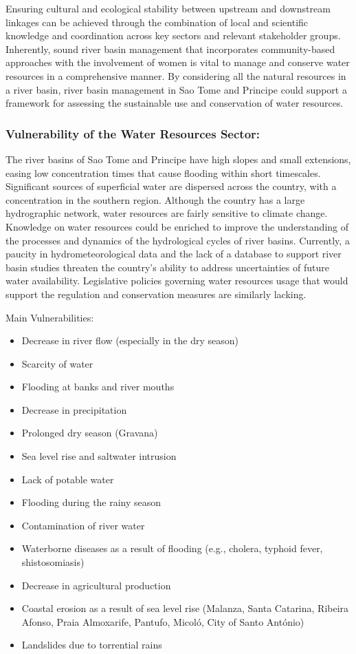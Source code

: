 \documentclass[
]{book}
\providecommand{\tightlist}{%
  \setlength{\itemsep}{0pt}\setlength{\parskip}{0pt}}
\begin{document}
Ensuring cultural and ecological stability between upstream and downstream linkages can be achieved through the combination of local and scientific knowledge and coordination across key sectors and relevant stakeholder groups. Inherently, sound river basin management that incorporates community-based approaches with the involvement of women is vital to manage and conserve water resources in a comprehensive manner. By considering all the natural resources in a river basin, river basin management in Sao Tome and Principe could support a framework for assessing the sustainable use and conservation of water resources.

\hypertarget{vulnerability-of-the-water-resources-sector-1}{%
\subsubsection{Vulnerability of the Water Resources Sector:}\label{vulnerability-of-the-water-resources-sector-1}}

The river basins of Sao Tome and Principe have high slopes and small extensions, easing low concentration times that cause flooding within short timescales. Significant sources of superficial water are dispersed across the country, with a concentration in the southern region. Although the country has a large hydrographic network, water resources are fairly sensitive to climate change. Knowledge on water resources could be enriched to improve the understanding of the processes and dynamics of the hydrological cycles of river basins. Currently, a paucity in hydrometeorological data and the lack of a database to support river basin studies threaten the country's ability to address uncertainties of future water availability. Legislative policies governing water resources usage that would support the regulation and conservation measures are similarly lacking.

Main Vulnerabilities:

\begin{itemize}
\tightlist
\item
  Decrease in river flow (especially in the dry season)
\item
  Scarcity of water
\item
  Flooding at banks and river mouths
\item
  Decrease in precipitation
\item
  Prolonged dry season (Gravana)
\item
  Sea level rise and saltwater intrusion
\item
  Lack of potable water
\item
  Flooding during the rainy season
\item
  Contamination of river water
\item
  Waterborne diseases as a result of flooding (e.g., cholera, typhoid fever, shistosomiasis)
\item
  Decrease in agricultural production
\item
  Coastal erosion as a result of sea level rise (Malanza, Santa Catarina, Ribeira Afonso, Praia Almoxarife, Pantufo, Micoló, City of Santo António)
\item
  Landslides due to torrential rains
\end{itemize}
\end{document}
